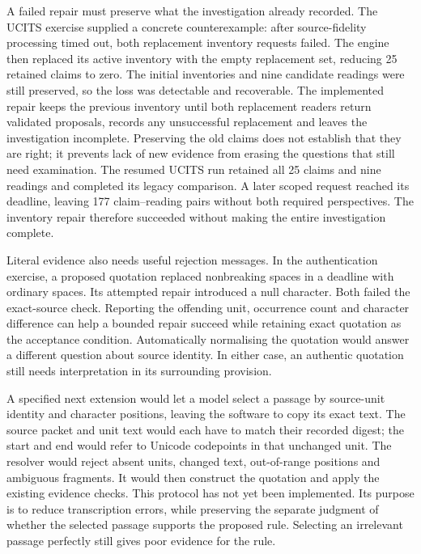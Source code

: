 A failed repair must preserve what the investigation already recorded. The
UCITS exercise supplied a concrete counterexample: after source-fidelity
processing timed out, both replacement inventory requests failed. The engine
then replaced its active inventory with the empty replacement set, reducing
25 retained claims to zero. The initial inventories and nine candidate readings
were still preserved, so the loss was detectable and recoverable. The implemented
repair keeps the previous inventory until both replacement readers return
validated proposals, records any unsuccessful replacement and leaves the
investigation incomplete. Preserving the old claims does not establish that
they are right; it prevents lack of new evidence from erasing the questions
that still need examination. The resumed UCITS run retained all 25 claims and
nine readings and completed its legacy comparison. A later scoped request
reached its deadline, leaving 177 claim--reading pairs without both required
perspectives. The inventory repair therefore succeeded without making the
entire investigation complete.

Literal evidence also needs useful rejection messages. In the authentication
exercise, a proposed quotation replaced nonbreaking spaces in a deadline with
ordinary spaces. Its attempted repair introduced a null character. Both failed
the exact-source check. Reporting the offending unit, occurrence count and
character difference can help a bounded repair succeed while retaining exact
quotation as the acceptance condition. Automatically normalising the quotation
would answer a different question about source identity. In either case, an
authentic quotation still needs interpretation in its surrounding provision.

A specified next extension would let a model select a passage by source-unit
identity and character positions, leaving the software to copy its exact text.
The source packet and unit text would each have to match their recorded digest;
the start and end would refer to Unicode codepoints in that unchanged unit.
The resolver would reject absent units, changed text, out-of-range positions
and ambiguous fragments. It would then construct the quotation and apply the
existing evidence checks. This protocol has not yet been implemented. Its
purpose is to reduce transcription errors, while preserving the separate
judgment of whether the selected passage supports the proposed rule. Selecting
an irrelevant passage perfectly still gives poor evidence for the rule.

